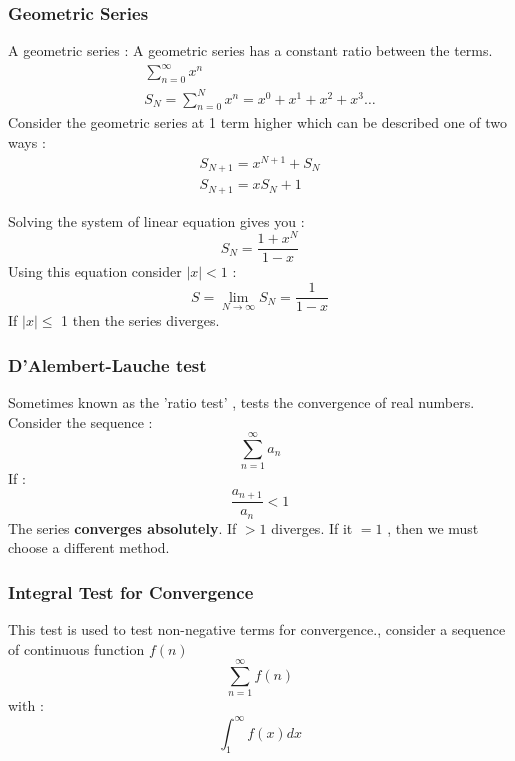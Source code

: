 \documentclass{article}
\newcommand{\be}{\begin{equation}}
\newcommand{\ee}{\end{equation}}
\begin{document}
\subsubsection*{Geometric Series}
A geometric series :
A geometric series has a constant ratio between the terms.
\be
\begin{split}
\sum_{n=0}^{\infty}x^n  \\
S_N = \sum_{n=0}^{N} x^n = x^0 +x^1 + x^2 + x^3 \hdots
\end{split}
\ee
Consider the geometric series at 1 term higher which can be described one of two ways :
\be
\begin{split}
S_{N+1} = x^{N+1} + S_N \\
S_{N+1} = xS_N + 1
\end{split}
\ee

Solving the system of linear equation gives you :
\be
S_N = \frac{1+x^N}{1-x}
\ee
Using this equation consider $|x| < 1$ :
\be
S = \lim_{N \to \infty}S_N = \frac{1}{1-x}
\ee
If $|x|\leq$ 1 then the series diverges.
\subsubsection*{D'Alembert-Lauche test}
Sometimes known as the 'ratio test' , tests the convergence of real numbers. Consider the sequence :
\be
\sum_{n=1}^{\infty}a_n
\ee
If :
\be
\frac{a_{n+1}}{a_n} < 1
\ee
The series \textbf{converges absolutely}. If $>1$ diverges.
If it $=1$ , then we must choose a different method.
\subsubsection*{Integral Test for Convergence}
This test is used to test non-negative terms for convergence., consider a sequence of continuous function $f(n)$
\be
\sum_{n=1}^{\infty} f(n)
\ee
with :
\be
\int_{1}^{\infty}f(x)dx
\ee
\end{document}
